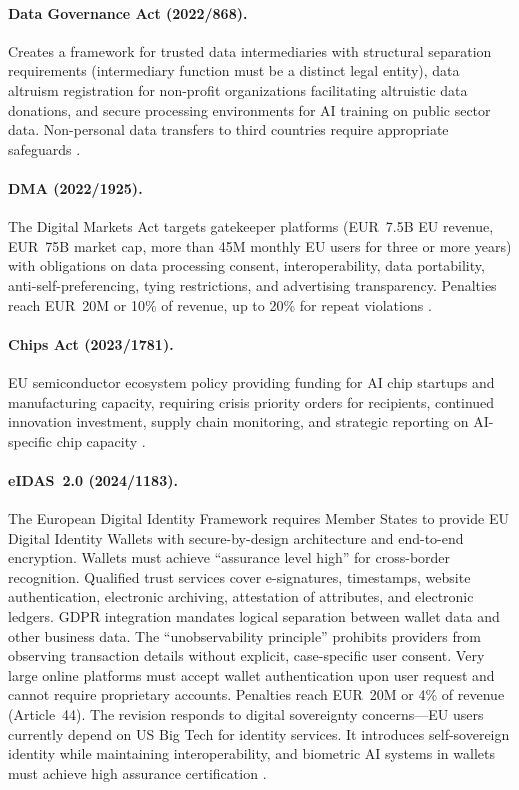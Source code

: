 \documentclass[11pt,a4paper]{article}
\begin{document}
\paragraph{Data Governance Act (2022/868).}
Creates a framework for trusted data intermediaries with structural separation requirements (intermediary function must be a distinct legal entity), data altruism registration for non-profit organizations facilitating altruistic data donations, and secure processing environments for AI training on public sector data. Non-personal data transfers to third countries require appropriate safeguards \cite{dga}.

\paragraph{DMA (2022/1925).}
The Digital Markets Act targets gatekeeper platforms (EUR~7.5B EU revenue, EUR~75B market cap, more than 45M monthly EU users for three or more years) with obligations on data processing consent, interoperability, data portability, anti-self-preferencing, tying restrictions, and advertising transparency. Penalties reach EUR~20M or 10\% of revenue, up to 20\% for repeat violations \cite{dma}.

\paragraph{Chips Act (2023/1781).}
EU semiconductor ecosystem policy providing funding for AI chip startups and manufacturing capacity, requiring crisis priority orders for recipients, continued innovation investment, supply chain monitoring, and strategic reporting on AI-specific chip capacity \cite{chipsact}.

\paragraph{eIDAS~2.0 (2024/1183).}
The European Digital Identity Framework requires Member States to provide EU Digital Identity Wallets with secure-by-design architecture and end-to-end encryption. Wallets must achieve ``assurance level high'' for cross-border recognition. Qualified trust services cover e-signatures, timestamps, website authentication, electronic archiving, attestation of attributes, and electronic ledgers. GDPR integration mandates logical separation between wallet data and other business data. The ``unobservability principle'' prohibits providers from observing transaction details without explicit, case-specific user consent. Very large online platforms must accept wallet authentication upon user request and cannot require proprietary accounts. Penalties reach EUR~20M or 4\% of revenue (Article~44). The revision responds to digital sovereignty concerns---EU users currently depend on US Big Tech for identity services. It introduces self-sovereign identity while maintaining interoperability, and biometric AI systems in wallets must achieve high assurance certification \cite{eidas2}.
\end{document}
